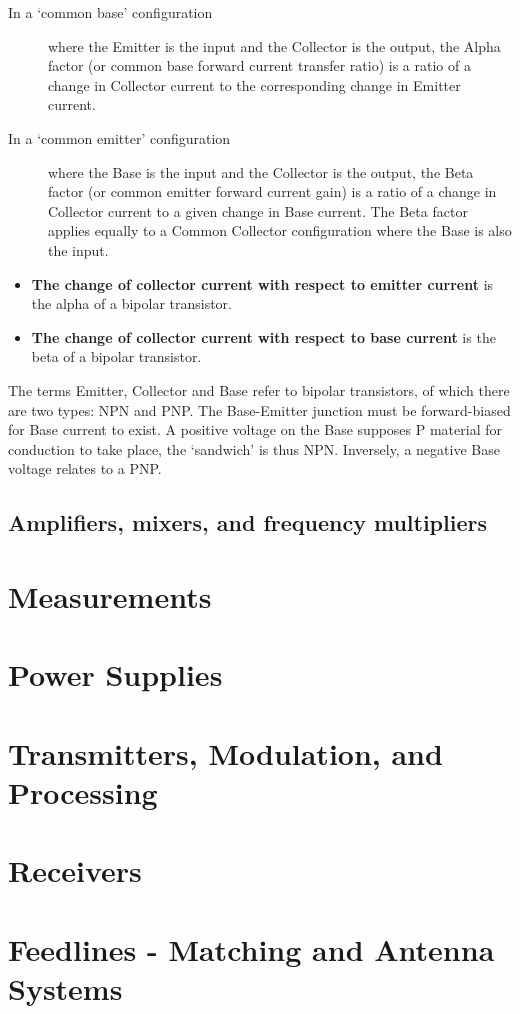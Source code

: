 \documentclass[letterpaper]{article}
\begin{document}
        \begin{description}
            \item[In a `common base' configuration] where the Emitter is the input and the Collector is the output, the Alpha factor (or common base forward current transfer ratio) is a ratio of a change in Collector current to the corresponding change in Emitter current.
            \item[In a `common emitter' configuration] where the Base is the input and the Collector is the output, the Beta factor (or common emitter forward current gain) is a ratio of a change in Collector current to a given change in Base current.
            The Beta factor applies equally to a Common Collector configuration where the Base is also the input.
        \end{description}
        \begin{itemize}
            \item \textbf{The change of collector current with respect to emitter current} is the alpha of a bipolar transistor.
            \item \textbf{The change of collector current with respect to base current} is the beta of a bipolar transistor.
        \end{itemize}

        The terms Emitter, Collector and Base refer to bipolar transistors, of which there are two types: NPN and PNP\@.
        The Base-Emitter junction must be forward-biased for Base current to exist.
        A positive voltage on the Base supposes P material for conduction to take place, the `sandwich' is thus NPN\@.
        Inversely, a negative Base voltage relates to a PNP.

        \newpage

        \subsection{Amplifiers, mixers, and frequency multipliers}

        \newpage

        \section{Measurements}

        \newpage

        \section{Power Supplies}

    \newpage

    \section{Transmitters, Modulation, and Processing}

    \newpage

    \section{Receivers}

    \newpage

    \section{Feedlines - Matching and Antenna Systems}
\end{document}

